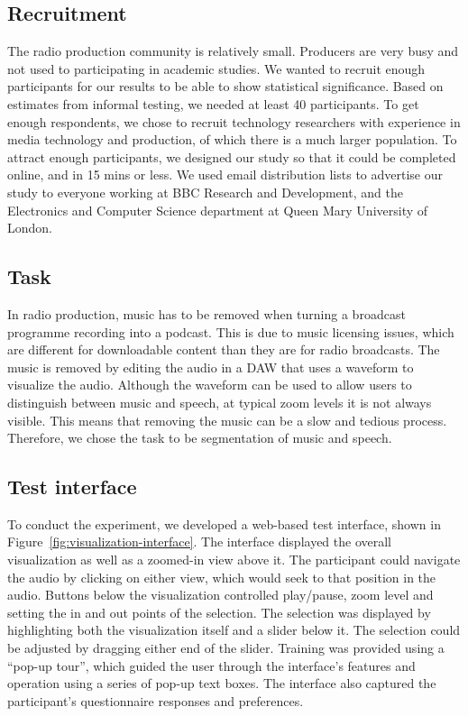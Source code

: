 \subsection{Recruitment}
The radio production community is relatively small. Producers are very busy and not used to participating in academic
studies.  We wanted to recruit enough participants for our results to be able to show statistical significance. Based
on estimates from informal testing, we needed at least 40 participants.  To get enough respondents, we chose to recruit
technology researchers with experience in media technology and production, of which there is a much larger population.
To attract enough participants, we designed our study so that it could be completed online, and in 15 mins or less.  We
used email distribution lists to advertise our study to everyone working at BBC Research and Development, and the
Electronics and Computer Science department at Queen Mary University of London.

\subsection{Task}
In radio production, music has to be removed when turning a broadcast programme recording into a podcast. This is due
to music licensing issues, which are different for downloadable content than they are for radio broadcasts. The music
is removed by editing the audio in a DAW that uses a waveform to visualize the audio. Although the waveform can be
used to allow users to distinguish between music and speech, at typical zoom levels it is not always visible. This
means that removing the music can be a slow and tedious process. Therefore, we chose the task to be segmentation of
music and speech.

\subsection{Test interface}

To conduct the experiment, we developed a web-based test interface, shown in Figure~\ref{fig:visualization-interface}.
The interface displayed the overall visualization as well as a zoomed-in view above it. The participant could navigate
the audio by clicking on either view, which would seek to that position in the audio.  Buttons below the visualization
controlled play/pause, zoom level and setting the in and out points of the selection.  The selection was displayed by
highlighting both the visualization itself and a slider below it. The selection could be adjusted by dragging either
end of the slider.  Training was provided using a ``pop-up tour'', which guided the user through the interface's
features and operation using a series of pop-up text boxes.  The interface also captured the participant's
questionnaire responses and preferences.

